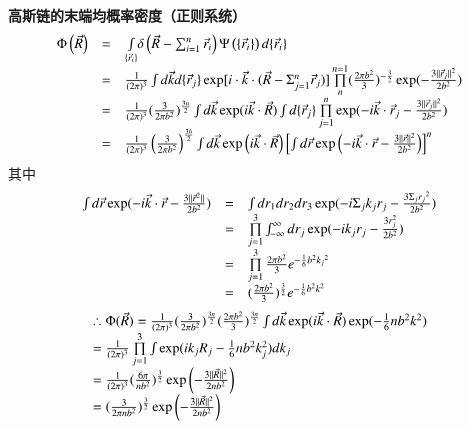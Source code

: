 \documentclass{article} %
\begin{document}
{\bf  高斯链的末端均概率密度（正则系统）
\[\begin{array}{rcl} {\Phi \left(\vec{R}\right)} & {=} & {{\mathop{\smallint }\limits_{\{ \vec{r}_{i} \} }} \delta \left(\vec{R}-\sum _{i=1}^{n}\vec{r}_{i}  \right){\rm \Psi }\left(\{ \vec{r}_{i} \} \right)d\{ \vec{r}_{i} \} } \\ {} & {=} & {\frac{1}{(2\pi )^{3} } \smallint d\vec{k}d\{ \vec{r}_{j} \} \exp [i\cdot \vec{k}\cdot (\vec{R}-{\rm \Sigma }_{j=1}^{n} \vec{r}_{j} )]\mathop{\prod }\limits_{n}^{n=1} (\frac{2\pi b^{2} }{3} )^{-\frac{3}{2} } \exp (-\frac{3||\vec{r}_{j} ||^{2} }{2b^{2} } )} \\ {} & {=} & {\frac{1}{(2\pi )^{3} } (\frac{3}{2\pi b^{2} } )^{\frac{3n}{2} } \smallint d\vec{k}\exp (i\vec{k}\cdot \vec{R})\smallint d\{ \vec{r}_{j} \} \mathop{\prod }\limits_{j=1}^{n} \exp (-i\vec{k}\cdot \vec{r}_{j} -\frac{3||\vec{r}_{j} ||^{2} }{2b^{2} } )} \\ {} & {=} & {\frac{1}{(2\pi )^{3} } \left(\frac{3}{2\pi b^{2} } \right)^{\frac{3h}{2} } \smallint d\vec{k}\exp \left(i\vec{k}\cdot \vec{R}\right)\left[\smallint d\vec{r}\exp \left(-i\vec{k}\cdot \vec{r}-\frac{3||\vec{r}||^{2} }{2b^{2} } \right)\right]^{n} } \end{array}\] }
其中
\[\begin{array}{rcl} {\smallint d\vec{r}\exp (-i\vec{k}\cdot \vec{r}-\frac{3||\vec{r}^{2} ||}{2b^{2} } )} & {=} & {\smallint dr_{1} dr_{2} dr_{3} \exp (-i{\rm \Sigma }_{j} k_{j} r_{j} -\frac{3{\rm \Sigma }_{j} r_{j} {}^{2} }{2b^{2} } )} \\ {} & {=} & {\mathop{\prod }\limits_{j=1}^{3} \smallint _{-\infty }^{\infty } dr_{j} \exp (-ik_{j} r_{j} -\frac{3r_{j}^{2} }{2b^{2} } )} \\ {} & {=} & {\mathop{\prod }\limits_{j=1}^{3} \frac{2\pi b^{2} }{3} e^{-\frac{1}{6} b^{2} k_{j} {}^{2} } } \\ {} & {=} & {(\frac{2\pi b^{2} }{3} )^{\frac{3}{2} } e^{-\frac{1}{6} b^{2} k^{2} } } \end{array}\] 
\[\begin{array}{l} {\mathrm{\therefore \Phi }(\vec{R})=\frac{1}{(2\pi )^{3} } (\frac{3}{2\pi b^{2} } )^{\frac{3n}{2} } (\frac{2\pi b^{2} }{3} )^{\frac{3n}{2} } \smallint d\vec{k}\exp (i\vec{k}\cdot \vec{R})\exp (-\frac{1}{6} nb^{2} k^{2} )} \\ {=\frac{1}{(2\pi )^{3} } \mathop{\prod }\limits_{j=1}^{3} \smallint \exp (ik_{j} R_{j} -\frac{1}{6} nb^{2} k_{j}^{2} )dk_{j} } \\ {=\frac{1}{(2\pi )^{3} } (\frac{6\pi }{nb^{2} } )^{\frac{3}{2} } \exp \left(-\frac{3\parallel \vec{R}\parallel ^{2} }{2nb^{2} } \right)} \\ {=(\frac{3}{2\pi nb^{2} } )^{\frac{3}{2} } \exp \left(-\frac{3\parallel \vec{R}\parallel ^{2} }{2nb^{2} } \right)} \end{array}\] 
\end{document}
